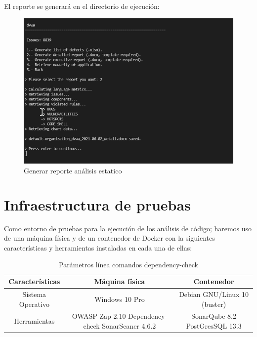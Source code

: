 El reporte se generará en el directorio de ejecución:

\begin{figure}[h!]  
    \includegraphics[width=\linewidth]{./imagenes/017_SonarQubeReportTool_4.png}
    \caption{Generar reporte análisis estatico}  
    \label{fig:18}
\end{figure}

\newpage
\section{Infraestructura de pruebas} 
Como entorno de pruebas para la ejecución de los análisis de código; haremos uso de una máquina física y de un contenedor 
de Docker con la siguientes características y herramientas instaladas en cada una de ellas:

\begin{table}[h!]
    \begin{center}
      \caption{Parámetros línea comandos dependency-check}
      \label{tab:Infraestructura de pruebas}
      \begin{tabular}{c|c|c}
        \textbf{Características} & \textbf{Máquina física} & \textbf{Contenedor}\\
        \hline
        Sistema Operativo & Windows 10 Pro & Debian GNU/Linux 10 (buster)\\ 
        Herramientas & OWASP Zap 2.10
        Dependency-check
        SonarScaner 4.6.2
         & SonarQube 8.2
         PostGresSQL 13.3 \\ 
      \end{tabular}
    \end{center}
  \end{table}

